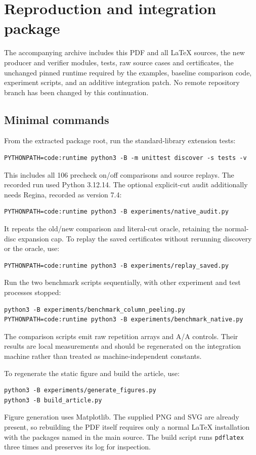 \section{Reproduction and integration package}
\label{sec:reproduction}

The accompanying archive includes this PDF and all \LaTeX{} sources, the
new producer and verifier modules, tests, raw source cases and certificates,
the unchanged pinned runtime required by the examples, baseline comparison
code, experiment scripts, and an additive integration patch.  No remote
repository branch has been changed by this continuation.

\subsection{Minimal commands}

From the extracted package root, run the standard-library extension tests:
\begin{verbatim}
PYTHONPATH=code:runtime python3 -B -m unittest discover -s tests -v
\end{verbatim}
This includes all 106 precheck on/off comparisons and source replays.
The recorded run used Python 3.12.14.  The optional explicit-cut audit
additionally needs Regina, recorded as version 7.4:
\begin{verbatim}
PYTHONPATH=code:runtime python3 -B experiments/native_audit.py
\end{verbatim}
It repeats the old/new comparison and literal-cut oracle, retaining the
normal-disc expansion cap.  To replay the saved certificates without
rerunning discovery or the oracle, use:
\begin{verbatim}
PYTHONPATH=code:runtime python3 -B experiments/replay_saved.py
\end{verbatim}

Run the two benchmark scripts sequentially, with other experiment and test
processes stopped:
\begin{verbatim}
python3 -B experiments/benchmark_column_peeling.py
PYTHONPATH=code:runtime python3 -B experiments/benchmark_native.py
\end{verbatim}
The comparison scripts emit raw repetition arrays and A/A controls.
Their results are local measurements and should be regenerated on the
integration machine rather than treated as machine-independent constants.

To regenerate the static figure and build the article, use:
\begin{verbatim}
python3 -B experiments/generate_figures.py
python3 -B build_article.py
\end{verbatim}
Figure generation uses Matplotlib.  The supplied PNG and SVG are already
present, so rebuilding the PDF itself requires only a normal \LaTeX{}
installation with the packages named in the main source.  The build script
runs \texttt{pdflatex} three times and preserves its log for inspection.

